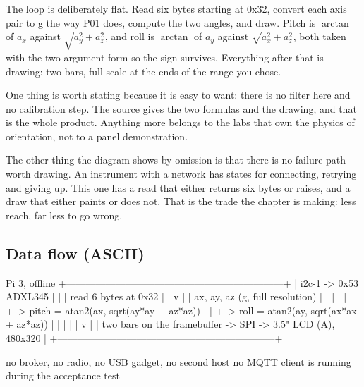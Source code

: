 
The loop is deliberately flat. Read six bytes starting at 0x32, convert each axis pair to g the way P01 does, compute the two angles, and draw. Pitch is $\arctan$ of $a_x$ against $\sqrt{a_y^{2} + a_z^{2}}$, and roll is $\arctan$ of $a_y$ against $\sqrt{a_x^{2} + a_z^{2}}$, both taken with the two-argument form so the sign survives. Everything after that is drawing: two bars, full scale at the ends of the range you chose.

One thing is worth stating because it is easy to want: there is no filter here and no calibration step. The source gives the two formulas and the drawing, and that is the whole product. Anything more belongs to the labs that own the physics of orientation, not to a panel demonstration.

The other thing the diagram shows by omission is that there is no failure path worth drawing. An instrument with a network has states for connecting, retrying and giving up. This one has a read that either returns six bytes or raises, and a draw that either paints or does not. That is the trade the chapter is making: less reach, far less to go wrong.

\subsection*{Data flow (ASCII)}

\begin{asciiart}
  Pi 3, offline
  +------------------------------------------------------------------+
  |  i2c-1 -> 0x53 ADXL345                                            |
  |     |  read 6 bytes at 0x32                                       |
  |     v                                                             |
  |  ax, ay, az  (g, full resolution)                                 |
  |     |                                                             |
  |     +--> pitch = atan2(ax, sqrt(ay*ay + az*az))                   |
  |     +--> roll  = atan2(ay, sqrt(ax*ax + az*az))                   |
  |               |                                                   |
  |               v                                                   |
  |  two bars on the framebuffer  ->  SPI  ->  3.5" LCD (A), 480x320  |
  +------------------------------------------------------------------+

  no broker, no radio, no USB gadget, no second host
  no MQTT client is running during the acceptance test
\end{asciiart}

